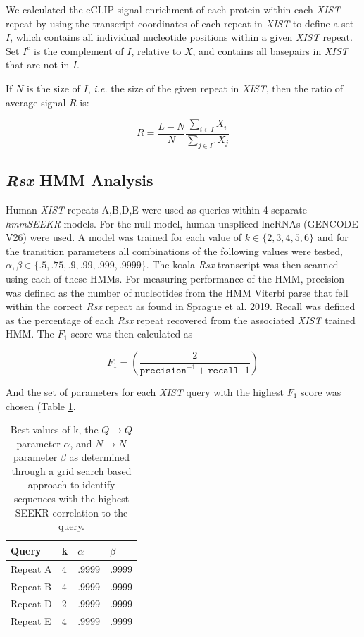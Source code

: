 We calculated the eCLIP signal enrichment of each protein within each \emph{XIST} repeat by using the transcript coordinates of each repeat in \emph{XIST} to define a set $I$, which contains all individual nucleotide positions within a given \emph{XIST} repeat. Set $I^c$ is the complement of $I$, relative to $X$,  and contains all basepairs in \emph{XIST} that are not in $I$. 

If $N$ is the size of $I$, \emph{i.e.} the size of the given repeat in \emph{XIST}, then the ratio of average signal $R$ is:

$$R = \frac{L-N}{N}\frac{\sum_{i\in{I}}{X_i}}{{\sum_{j\in{I^c}}{X_j}}}$$

\subsection{\emph{Rsx} HMM Analysis}

Human \emph{XIST} repeats A,B,D,E were used as queries within 4 separate \emph{hmmSEEKR} models. For the null model, human unspliced lncRNAs (GENCODE V26) were used. A model was trained for each value of $k \in \{2,3,4,5,6\}$ and for the transition parameters all combinations of the following values were tested, $\alpha,\beta \in \{.5, .75, .9, .99, .999, .9999$\}. The koala \emph{Rsx} transcript was then scanned using each of these HMMs. For measuring performance of the HMM, precision was defined as the number of nucleotides from the HMM Viterbi parse that fell within the correct \emph{Rsx} repeat as found in Sprague et al. 2019. Recall was defined as the percentage of each \emph{Rsx} repeat recovered from the associated \emph{XIST} trained HMM. The $F_1$ score was then calculated as 

\begin{equation}
    F_1 = \left(\frac{2}{\texttt{precision}^{-1}+\texttt{recall}{^-1}}\right)
\end{equation}

And the set of parameters for each \emph{XIST} query with the highest $F_1$ score was chosen (Table \ref{tbl:rsxparams}.

\begin{table}[h]
\centering
\begin{center}
 \begin{tabular}{|l| l| l | l |} 
 \hline
 Query & k & $\alpha$ & $\beta$ \\
 \hline
 Repeat A & 4 & .9999 & .9999 \\ 
 \hline
 Repeat B & 4 & .9999 & .9999\\
 \hline
 Repeat D & 2 & .9999 & .9999\\
 \hline
 Repeat E & 4 & .9999 & .9999\\
 \hline
\end{tabular}
\end{center}
\caption{Best values of k, the $Q\rightarrow Q$ parameter $\alpha$, and $N\rightarrow N$ parameter $\beta$ as determined through a grid search based approach to identify sequences with the highest SEEKR correlation to the query.}
\label{tbl:rsxparams}
\end{table}

